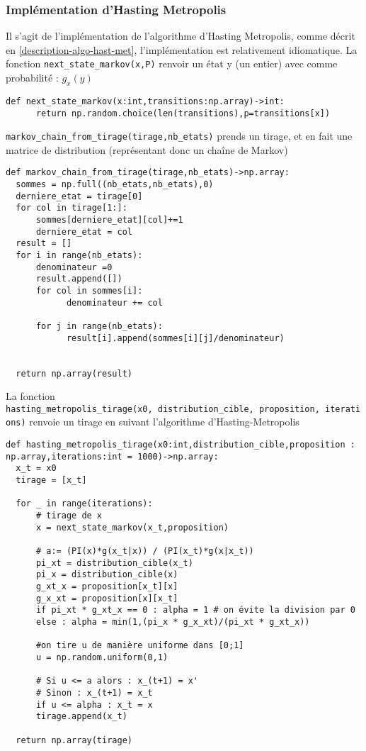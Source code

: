 \documentclass{article}
\begin{document}
\subsubsection{Implémentation d'Hasting Metropolis}

Il s'agit de l'implémentation de l'algorithme d'Hasting Metropolis, comme décrit en \ref{description-algo-hast-met}, 
l'implémentation est relativement idiomatique.
La fonction \texttt{next\_state\_markov(x,P)} renvoir un état y (un entier) avec comme probabilité : $g_{x}(y)$

\begin{verbatim}
def next_state_markov(x:int,transitions:np.array)->int:
      return np.random.choice(len(transitions),p=transitions[x])
\end{verbatim}

\texttt{markov\_chain\_from\_tirage(tirage,nb\_etats)} prends un tirage, et en fait une matrice de distribution (représentant donc un chaîne de Markov)

\begin{verbatim}
def markov_chain_from_tirage(tirage,nb_etats)->np.array:
  sommes = np.full((nb_etats,nb_etats),0)
  derniere_etat = tirage[0]
  for col in tirage[1:]:
      sommes[derniere_etat][col]+=1
      derniere_etat = col
  result = []
  for i in range(nb_etats):
      denominateur =0
      result.append([])
      for col in sommes[i]:
            denominateur += col

      for j in range(nb_etats):
            result[i].append(sommes[i][j]/denominateur)
      
  
  return np.array(result) 
\end{verbatim}

La fonction \texttt{hasting\_metropolis\_tirage(x0,\ distribution\_cible,\ proposition,\ iterations)}
renvoie un tirage en suivant l'algorithme d'Hasting-Metropolis

\begin{verbatim}
def hasting_metropolis_tirage(x0:int,distribution_cible,proposition : np.array,iterations:int = 1000)->np.array:
  x_t = x0
  tirage = [x_t]

  for _ in range(iterations):
      # tirage de x
      x = next_state_markov(x_t,proposition)

      # a:= (PI(x)*g(x_t|x)) / (PI(x_t)*g(x|x_t))
      pi_xt = distribution_cible(x_t)
      pi_x = distribution_cible(x)
      g_xt_x = proposition[x_t][x]
      g_x_xt = proposition[x][x_t]
      if pi_xt * g_xt_x == 0 : alpha = 1 # on évite la division par 0
      else : alpha = min(1,(pi_x * g_x_xt)/(pi_xt * g_xt_x))

      #on tire u de manière uniforme dans [0;1]
      u = np.random.uniform(0,1)

      # Si u <= a alors : x_(t+1) = x'
      # Sinon : x_(t+1) = x_t
      if u <= alpha : x_t = x
      tirage.append(x_t)

  return np.array(tirage)
\end{verbatim}
\end{document}
